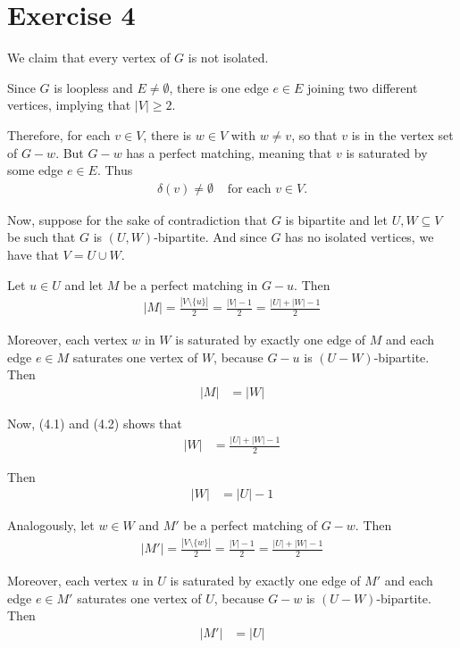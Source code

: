\documentclass[a4paper,10pt, leqno]{article}
\theoremstyle{definition}
\begin{document}
\section*{Exercise 4}
We claim that every vertex of $G$ is not isolated.

Since $G$ is loopless and $E \neq \emptyset$, there is one edge $e \in E$ joining two different vertices, implying that $|V| \geq 2$.

Therefore, for each $v \in V$, there is $w \in V$ with $w \neq v$, so that $v$ is in the vertex set of $G - w$. But $G - w$ has a perfect matching, meaning that $v$ is saturated by some edge $e \in E$. Thus 
\begin{align*}
 \delta(v) \neq \emptyset &\text{ for each } v \in V.
\end{align*} 

Now, suppose for the sake of contradiction that $G$ is bipartite and let $U, W \subseteq V$ be such that $G$ is $(U, W)$-bipartite. And since $G$ has no isolated vertices, we have that $V = U \cup W$.

Let $u \in U$ and let $M$ be a perfect matching in $G - u$. Then
\begin{align*}
 \tag{4.1}
 |M| = \frac{|V \setminus \{u\}|}{2} = \frac{|V| - 1}{2} = \frac{|U| + |W| - 1}{2}
 \end{align*} 


Moreover, each vertex $w$ in $W$ is saturated by exactly one edge of $M$ and each edge $e \in M$ saturates one vertex of $W$, because $G - u$ is $(U-W)$-bipartite. Then
\begin{align*}
 \tag{4.2}
   |M| &= |W|
\end{align*}

Now, (4.1) and (4.2) shows that 
\begin{align*}
|W| &= \frac{|U| + |W| - 1}{2}
\end{align*}

Then
\begin{align*}
\tag{4.3}
|W| &= |U| - 1
\end{align*}

Analogously, let $w \in W$ and $M'$ be a perfect matching of $G - w$. Then
\begin{align*}
 \tag{4.4}
 |M'| = \frac{|V \setminus \{w\}|}{2} = \frac{|V| - 1}{2} = \frac{|U| + |W| - 1}{2}
 \end{align*} 

Moreover, each vertex $u$ in $U$ is saturated by exactly one edge of $M'$ and each edge $e \in M'$ saturates one vertex of $U$, because $G - w$ is $(U-W)$-bipartite. Then
\begin{align*}
 \tag{4.5}
   |M'| &= |U|
\end{align*}
\end{document}
